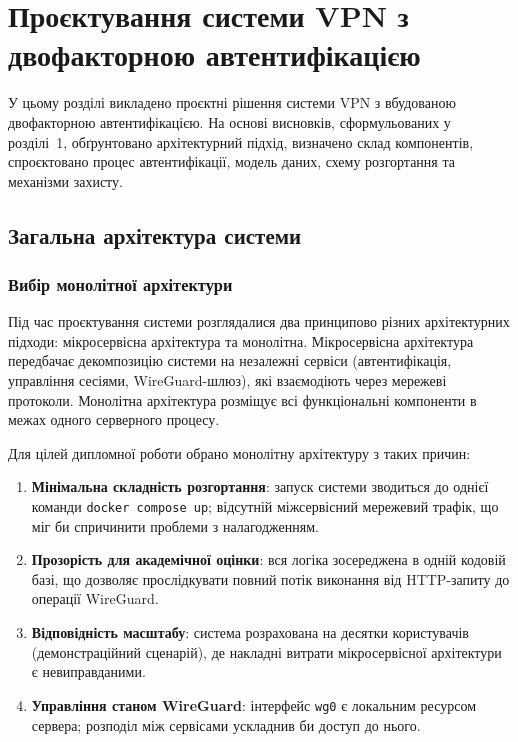 \chapter{Проєктування системи VPN з двофакторною автентифікацією}

У цьому розділі викладено проєктні рішення системи VPN з вбудованою
двофакторною автентифікацією. На основі висновків, сформульованих у
розділі~1, обґрунтовано архітектурний підхід, визначено склад компонентів,
спроєктовано процес автентифікації, модель даних, схему розгортання та
механізми захисту.

\section{Загальна архітектура системи}
\label{sec:architecture_overview}

\subsection{Вибір монолітної архітектури}

Під час проєктування системи розглядалися два принципово різних
архітектурних підходи: мікросервісна архітектура та монолітна. Мікросервісна
архітектура передбачає декомпозицію системи на незалежні сервіси (автентифікація,
управління сесіями, WireGuard-шлюз), які взаємодіють через мережеві протоколи.
Монолітна архітектура розміщує всі функціональні компоненти в межах одного
серверного процесу.

Для цілей дипломної роботи обрано монолітну архітектуру з таких причин:

\begin{enumerate}
  \item \textbf{Мінімальна складність розгортання}: запуск системи зводиться
    до однієї команди \texttt{docker compose up}; відсутній міжсервісний
    мережевий трафік, що міг би спричинити проблеми з налагодженням.

  \item \textbf{Прозорість для академічної оцінки}: вся логіка зосереджена
    в одній кодовій базі, що дозволяє прослідкувати повний потік виконання
    від HTTP-запиту до операції WireGuard.

  \item \textbf{Відповідність масштабу}: система розрахована на десятки
    користувачів (демонстраційний сценарій), де накладні витрати мікросервісної
    архітектури є невиправданими.

  \item \textbf{Управління станом WireGuard}: інтерфейс \texttt{wg0} є
    локальним ресурсом сервера; розподіл між сервісами ускладнив би доступ
    до нього.
\end{enumerate}

